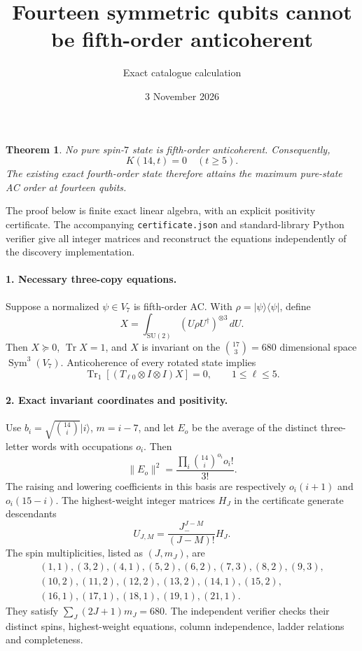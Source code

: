 \documentclass[11pt]{article}
\newtheorem{theorem}{Theorem}
\newcommand{\Tr}{\operatorname{Tr}}
\begin{document}
\title{Fourteen symmetric qubits cannot be fifth-order anticoherent}
\author{Exact catalogue calculation}
\date{3 November 2026}
\maketitle

\begin{theorem}
No pure spin-$7$ state is fifth-order anticoherent. Consequently,
\[
\boxed{K(14,t)=0\quad(t\ge5).}
\]
The existing exact fourth-order state therefore attains the maximum
pure-state AC order at fourteen qubits.
\end{theorem}

The proof below is finite exact linear algebra, with an explicit positivity
certificate. The accompanying \texttt{certificate.json} and standard-library
Python verifier give all integer matrices and reconstruct the equations
independently of the discovery implementation.

\paragraph{1. Necessary three-copy equations.}
Suppose a normalized $\psi\in V_7$ is fifth-order AC. With
$\rho=|\psi\rangle\langle\psi|$, define
\[
X=\int_{\mathrm{SU}(2)}(U\rho U^\dagger)^{\otimes3}\,dU.
\]
Then $X\succeq0$, $\Tr X=1$, and $X$ is invariant on the
$\binom{17}{3}=680$ dimensional space $\operatorname{Sym}^3(V_7)$.
Anticoherence of every rotated state implies
\begin{equation}\label{eq:necessary}
\Tr_1[(T_{\ell0}\otimes I\otimes I)X]=0,
\qquad 1\le\ell\le5.
\end{equation}

\paragraph{2. Exact invariant coordinates and positivity.}
Use $b_i=\sqrt{\binom{14}{i}}|i\rangle$, $m=i-7$, and let $E_o$ be
the average of the distinct three-letter words with occupations $o_i$.
Then
\[
\|E_o\|^2=\frac{\prod_i\binom{14}{i}^{o_i}o_i!}{3!}.
\]
The raising and lowering coefficients in this basis are respectively
$o_i(i+1)$ and $o_i(15-i)$. The highest-weight integer matrices $H_J$
in the certificate generate descendants
\[
U_{J,M}=\frac{J_-^{J-M}}{(J-M)!}H_J.
\]
The spin multiplicities, listed as $(J,m_J)$, are
\[
\begin{gathered}
(1,1),(3,2),(4,1),(5,2),(6,2),(7,3),(8,2),(9,3),\\
(10,2),(11,2),(12,2),(13,2),(14,1),(15,2),\\
(16,1),(17,1),(18,1),(19,1),(21,1).
\end{gathered}
\]
They satisfy $\sum_J(2J+1)m_J=680$. The independent verifier checks
their distinct spins, highest-weight equations, column independence,
ladder relations and completeness.
\end{document}
